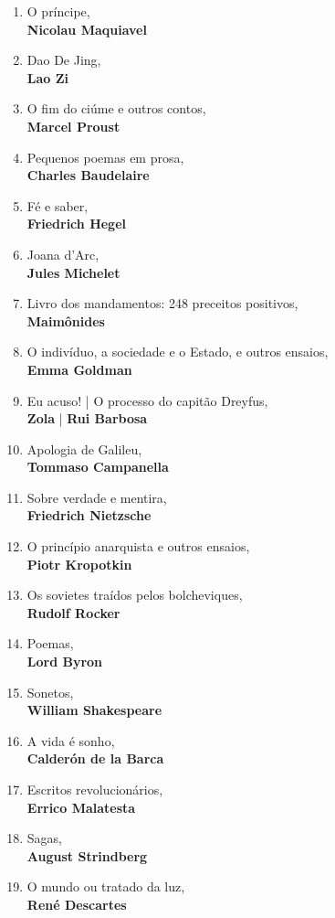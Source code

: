 \begin{enumerate} [font=\Formular\footnotesize]
\item O príncipe,\\ \textbf{Nicolau Maquiavel}
\item Dao De Jing,\\ \textbf{Lao Zi}
\item O fim do ciúme e outros contos,\\ \textbf{Marcel Proust}
\item Pequenos poemas em prosa,\\ \textbf{Charles Baudelaire}
\item Fé e saber,\\ \textbf{Friedrich Hegel}
\item Joana d'Arc,\\ \textbf{Jules Michelet}
\item Livro dos mandamentos: 248 preceitos positivos,\\ \textbf{Maimônides}
\item O indivíduo, a sociedade e o Estado, e outros ensaios,\\ \textbf{Emma Goldman}
\item Eu acuso! | O processo do capitão Dreyfus,\\ \textbf{Zola} | \textbf{Rui Barbosa}
\item Apologia de Galileu,\\ \textbf{Tommaso Campanella}
\item Sobre verdade e mentira,\\ \textbf{Friedrich Nietzsche}
\item O princípio anarquista e outros ensaios,\\ \textbf{Piotr Kropotkin}
\item Os sovietes traídos pelos bolcheviques,\\ \textbf{Rudolf Rocker}
\item Poemas,\\ \textbf{Lord Byron}
\item Sonetos,\\ \textbf{William Shakespeare}
\item A vida é sonho,\\ \textbf{Calderón de la Barca}
\item Escritos revolucionários,\\ \textbf{Errico Malatesta}
\item Sagas,\\ \textbf{August Strindberg}
\item O mundo ou tratado da luz,\\ \textbf{René Descartes}

\end{enumerate}
